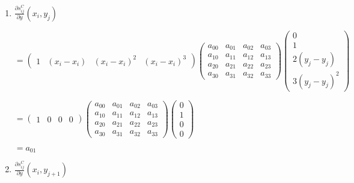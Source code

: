 \documentclass[11pt]{article}
\begin{document}
\begin{enumerate}[label=\textbf{\arabic*)}]
\begin{flushleft}
    $= a_{00} + a_{01}h_y + a_{02}h_y^2 + a_{03}h_y^3 + a_{10}h_x + a_{11}h_xh_y + a_{12}h_xh_y^2 + a_{13}h_xh_y^3 + a_{20}h_x^2 + a_{21}h_x^2h_y + a_{22}h_x^2h_y^2 + a_{23}h_x^2h_y^3 + a_{30}h_x^3 + a_{31}h_x^3h_y + a_{32}h_x^3h_y^2 + a_{33}h_x^3h_y^3$
    \end{flushleft}

    \item $\frac{\partial s_{ij}^C}{\partial y}(x_i, y_j)$

    \begin{flushleft}
    $= \begin{pmatrix}
      1 & (x_i - x_i) & (x_i - x_i)^2 & (x_i - x_i)^3
    \end{pmatrix}
    \begin{pmatrix}
      a_{00}  & a_{01} & a_{02} & a_{03} \\
      a_{10}  & a_{11} & a_{12} & a_{13} \\
      a_{20}  & a_{21} & a_{22} & a_{23} \\
      a_{30}  & a_{31} & a_{32} & a_{33}
    \end{pmatrix}
    \begin{pmatrix}
      0  \\
      1 \\
      2(y_j - y_j)  \\
      3(y_j - y_j)^2
    \end{pmatrix}$


    $= \begin{pmatrix}
      1 & 0 & 0 & 0
    \end{pmatrix}
    \begin{pmatrix}
      a_{00}  & a_{01} & a_{02} & a_{03} \\
      a_{10}  & a_{11} & a_{12} & a_{13} \\
      a_{20}  & a_{21} & a_{22} & a_{23} \\
      a_{30}  & a_{31} & a_{32} & a_{33}
    \end{pmatrix}
    \begin{pmatrix}
      0  \\
      1  \\
      0  \\
      0
    \end{pmatrix}$

    $= a_{01}$
    \end{flushleft}


    \item $\frac{\partial s_{ij}^C}{\partial y}(x_i, y_{j + 1})$


\end{enumerate}
\end{document}

